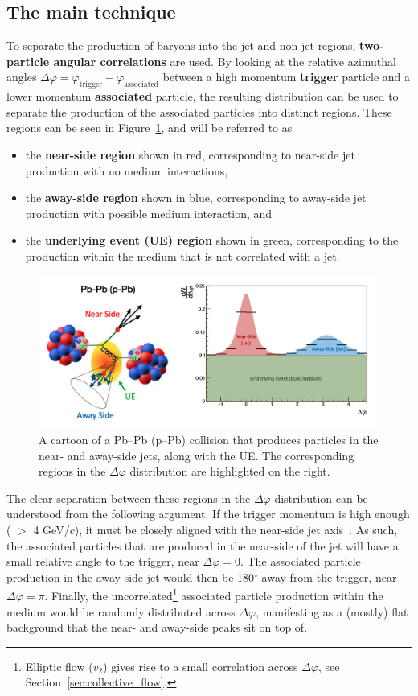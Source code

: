\subsection{The main technique}
To separate the production of \lmb baryons into the jet and non-jet regions, \textbf{two-particle angular correlations} are used. By looking at the relative azimuthal angles $\Delta\varphi = \varphi_{\text{trigger}} - \varphi_{\text{associated}}$ between a high momentum \textbf{trigger} particle and a lower momentum \textbf{associated} particle, the resulting distribution can be used to separate the production of the associated particles into distinct regions. These regions can be seen in Figure~\ref{fig:dphi_cartoon}, and will be referred to as
%
\begin{itemize}
\item the \textbf{near-side region} shown in red, corresponding to near-side jet production with no medium interactions, 
\item the \textbf{away-side region} shown in blue, corresponding to away-side jet production with possible medium interaction, and
\item the \textbf{underlying event (UE) region} shown in green, corresponding to the production within the medium that is not correlated with a jet.
\end{itemize}
%
\begin{figure}
\centering
\includegraphics[width=\textwidth]{figures/mnm/dphi_cartoon.png}
\caption{A cartoon of a Pb--Pb (p--Pb) collision that produces particles in the near- and away-side jets, along with the UE. The corresponding regions in the $\Delta\varphi$ distribution are highlighted on the right.}
\label{fig:dphi_cartoon}
\end{figure}

The clear separation between these regions in the $\Delta\varphi$ distribution can be understood from the following argument. If the trigger momentum is high enough ( $>$ 4 GeV/$c$), it must be closely aligned with the near-side jet axis~\cite{JetAxisArgument}. As such, the associated particles that are produced in the near-side of the jet will have a small relative angle to the trigger, near $\Delta\varphi = 0$. The associated particle production in the away-side jet would then be 180$^\circ$ away from the trigger, near $\Delta\varphi = \pi$. Finally, the uncorrelated\footnote{Elliptic flow ($v_2$) gives rise to a small correlation across $\Delta\varphi$, see Section~\ref{sec:collective_flow}.} associated particle production within the medium would be randomly distributed across $\Delta\varphi$, manifesting as a (mostly) flat background that the near- and away-side peaks sit on top of. 

